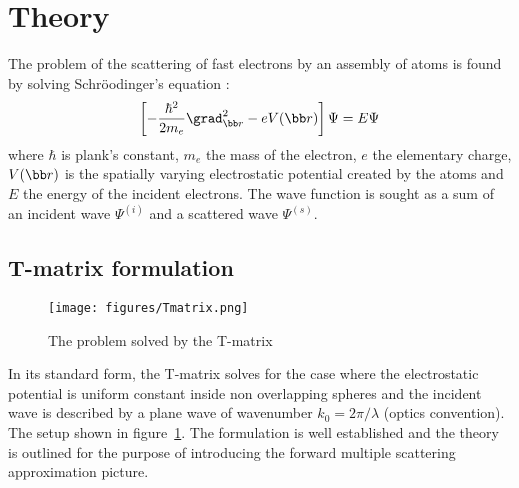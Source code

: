 \section{Theory}

The problem of the scattering of fast electrons by an assembly of atoms is
found by solving Schr{\"o}odinger's equation :
%
\begin{equation}\label{eq:schro}
  \left[-\frac{\hbar^2}{2m_e}\grad_{\bb r}^2 - eV(\bb r) \right] \Psi = E\Psi
\end{equation}
%
where $\hbar$ is plank's constant, $m_e$ the mass of the electron,
$e$ the elementary charge, $V(\bb r)$ is the spatially varying electrostatic
potential created by the atoms and $E$ the energy of the incident electrons.
The wave function is sought as a sum of an incident wave $\Psi^{(i)}$
and a scattered wave $\Psi^{(s)}$.

\subsection{T-matrix formulation}

\begin{figure}
  \centering
  \texttt{[image: figures/Tmatrix.png]}
\caption{The problem solved by the T-matrix}\label{fig:Tmatrix}
\end{figure}

In its standard form, the T-matrix solves for the case where the electrostatic
potential is uniform constant inside non overlapping spheres and the
incident wave is described by a plane wave of wavenumber $k_0=2\pi/\lambda$
(optics convention).
The setup shown in figure~\ref{fig:Tmatrix}.
The formulation is well established and the theory is outlined for the purpose
of introducing the forward multiple scattering approximation picture.

